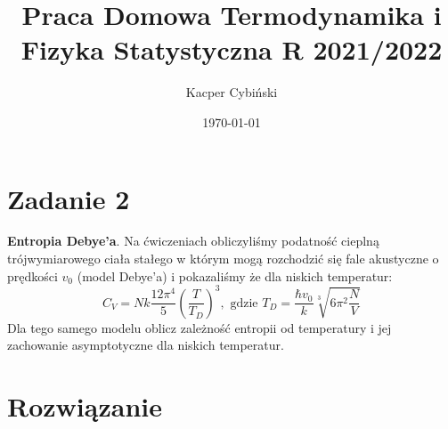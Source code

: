\documentclass[12pt,a4paper]{article}
\title{Praca Domowa Termodynamika i Fizyka Statystyczna R 2021/2022}
\author{Kacper Cybiński}
\date{\today}
\renewcommand{\emph}{\textbf}
\begin{document}
\maketitle

\section{Zadanie 2}

\emph{Entropia Debye'a}. Na ćwiczeniach obliczyliśmy podatność cieplną trójwymiarowego ciała stałego w którym mogą rozchodzić się fale akustyczne o prędkości $v_{0}$ (model Debye'a) i pokazaliśmy że dla niskich temperatur:
$$
C_{V}=N k \frac{12 \pi^{4}}{5}\left(\frac{T}{T_{D}}\right)^{3}, \text { gdzie } T_{D}=\frac{\hbar v_{0}}{k} \sqrt[3]{6 \pi^{2} \frac{N}{V}}
$$
Dla tego samego modelu oblicz zależność entropii od temperatury i jej zachowanie asymptotyczne dla niskich temperatur.

\section{Rozwiązanie}
\end{document}
